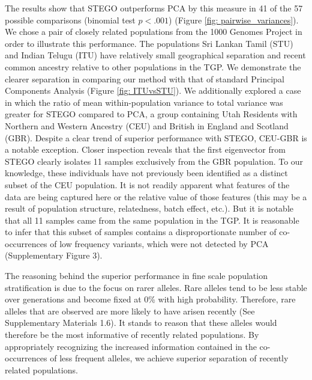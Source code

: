 The results show that STEGO outperforms PCA by this measure in 41
of the 57 possible comparisons (binomial test $p<.001$) (Figure \ref{fig: pairwise_variances}). We chose a pair of closely related populations from the
1000 Genomes Project in order to illustrate this performance. The
populations Sri Lankan Tamil (STU) and Indian Telugu (ITU) have relatively
small geographical separation and recent common ancestry relative
to other populations in the TGP. We demonstrate the clearer separation in comparing our method with that of standard Principal Components Analysis (Figure \ref{fig: ITUvsSTU}).  We additionally explored a case in which the ratio of mean within-population variance
to total variance was greater for STEGO compared to PCA, a group containing Utah Residents with Northern and Western Ancestry (CEU) and British in England and Scotland (GBR).  Despite a clear trend of superior performance with STEGO, CEU-GBR is a notable exception. Closer inspection reveals that the first eigenvector from STEGO clearly isolates 11 samples exclusively from the GBR population. To our knowledge, these individuals have not previously been identified as a distinct subset of the CEU population. It is not readily apparent what features of the data are being captured here or the relative value of those features (this may be a result of population structure, relatedness, batch effect, etc.). But it is notable that all 11 samples came from the same population in the TGP. It is reasonable to infer that this subset of samples contains a disproportionate number of co-occurrences of low frequency variants, which were not detected by PCA (Supplementary Figure 3).

The reasoning behind the superior performance in fine scale population
stratification is due to the focus on rarer alleles. Rare alleles
tend to be less stable over generations and become fixed at 0\% with
high probability. Therefore, rare alleles that are observed are more
likely to have arisen recently (See Supplementary Materials 1.6). It stands to reason that these alleles
would therefore be the most informative of recently related populations.
By appropriately recognizing the increased information contained in
the co-occurrences of less frequent alleles, we achieve superior separation
of recently related populations.

